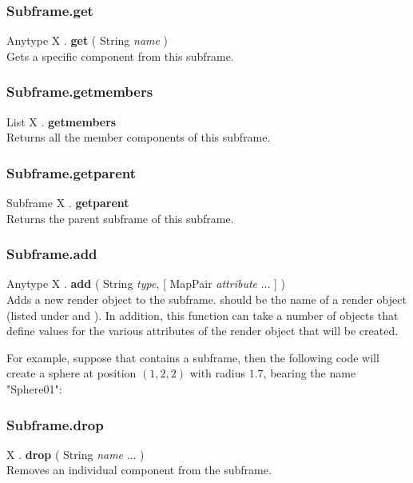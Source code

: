 \subsubsection{Subframe.get \label{F:Subframe:get}}
Anytype X . \textbf{get} ( String \textit{name} ) \\
Gets a specific component from this subframe.

\subsubsection{Subframe.getmembers \label{F:Subframe:getmembers}}
List X . \textbf{getmembers} \\
Returns all the member components of this subframe.

\subsubsection{Subframe.getparent \label{F:Subframe:getparent}}
Subframe X . \textbf{getparent} \\
Returns the parent subframe of this subframe.

\subsubsection{Subframe.add \label{F:Subframe:add}}
Anytype X . \textbf{add} ( String \textit{type},  [ MapPair \textit{attribute} ...  ] ) \\
Adds a new render object to the subframe.  should be the name of a render object (listed under  and ). In addition, this function can take a number of  objects that define values for the various attributes of the render object that will be created.

For example, suppose that  contains a subframe, then the following code will create a sphere at position $(1,2,2)$ with radius $1.7$, bearing the name "Sphere01": \\

\subsubsection{Subframe.drop \label{F:Subframe:drop}}
X . \textbf{drop} ( String \textit{name} ...  ) \\
Removes an individual component from the subframe.

